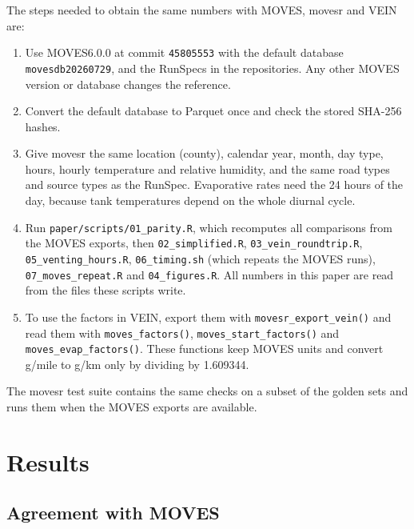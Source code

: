 \documentclass[preprint,
3p]{elsarticle} %
\providecommand{\tightlist}{%
  \setlength{\itemsep}{0pt}\setlength{\parskip}{0pt}}
\begin{document}
The steps needed to obtain the same numbers with MOVES, movesr and VEIN
are:

\begin{enumerate}
\def\labelenumi{\arabic{enumi}.}
\tightlist
\item
  Use MOVES6.0.0 at commit \texttt{45805553} with the default database
  \texttt{movesdb20260729}, and the RunSpecs in the repositories. Any
  other MOVES version or database changes the reference.
\item
  Convert the default database to Parquet once and check the stored
  SHA-256 hashes.
\item
  Give movesr the same location (county), calendar year, month, day
  type, hours, hourly temperature and relative humidity, and the same
  road types and source types as the RunSpec. Evaporative rates need the
  24 hours of the day, because tank temperatures depend on the whole
  diurnal cycle.
\item
  Run \texttt{paper/scripts/01\_parity.R}, which recomputes all
  comparisons from the MOVES exports, then \texttt{02\_simplified.R},
  \texttt{03\_vein\_roundtrip.R}, \texttt{05\_venting\_hours.R},
  \texttt{06\_timing.sh} (which repeats the MOVES runs),
  \texttt{07\_moves\_repeat.R} and \texttt{04\_figures.R}. All numbers
  in this paper are read from the files these scripts write.
\item
  To use the factors in VEIN, export them with
  \texttt{movesr\_export\_vein()} and read them with
  \texttt{moves\_factors()}, \texttt{moves\_start\_factors()} and
  \texttt{moves\_evap\_factors()}. These functions keep MOVES units and
  convert g/mile to g/km only by dividing by 1.609344.
\end{enumerate}

The movesr test suite contains the same checks on a subset of the golden
sets and runs them when the MOVES exports are available.

\section{Results}\label{results}

\subsection{Agreement with MOVES}\label{agreement-with-moves}
\end{document}
